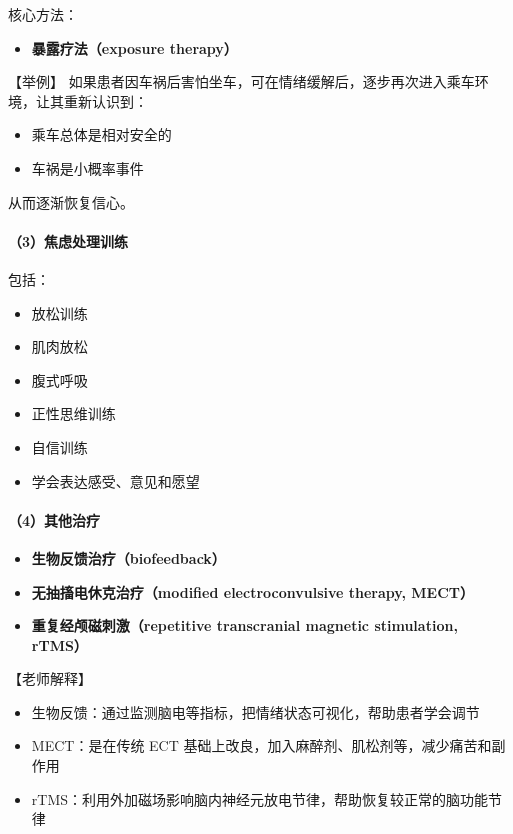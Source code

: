 \documentclass[
  chinese,
  9pt,
  a4paper,
]{ctexart}
\providecommand{\tightlist}{%
  \setlength{\itemsep}{0pt}\setlength{\parskip}{0pt}}
\begin{document}
核心方法：

\begin{itemize}
\tightlist
\item
  \textbf{暴露疗法（exposure therapy）}
\end{itemize}

【举例】
如果患者因车祸后害怕坐车，可在情绪缓解后，逐步再次进入乘车环境，让其重新认识到：

\begin{itemize}
\tightlist
\item
  乘车总体是相对安全的
\item
  车祸是小概率事件
\end{itemize}

从而逐渐恢复信心。

\paragraph{（3）焦虑处理训练}\label{ux7126ux8651ux5904ux7406ux8badux7ec3}

包括：

\begin{itemize}
\tightlist
\item
  放松训练
\item
  肌肉放松
\item
  腹式呼吸
\item
  正性思维训练
\item
  自信训练
\item
  学会表达感受、意见和愿望
\end{itemize}

\paragraph{（4）其他治疗}\label{ux5176ux4ed6ux6cbbux7597}

\begin{itemize}
\tightlist
\item
  \textbf{生物反馈治疗（biofeedback）}
\item
  \textbf{无抽搐电休克治疗（modified electroconvulsive therapy, MECT）}
\item
  \textbf{重复经颅磁刺激（repetitive transcranial magnetic stimulation,
  rTMS）}
\end{itemize}

【老师解释】

\begin{itemize}
\tightlist
\item
  生物反馈：通过监测脑电等指标，把情绪状态可视化，帮助患者学会调节
\item
  MECT：是在传统 ECT 基础上改良，加入麻醉剂、肌松剂等，减少痛苦和副作用
\item
  rTMS：利用外加磁场影响脑内神经元放电节律，帮助恢复较正常的脑功能节律
\end{itemize}
\end{document}
